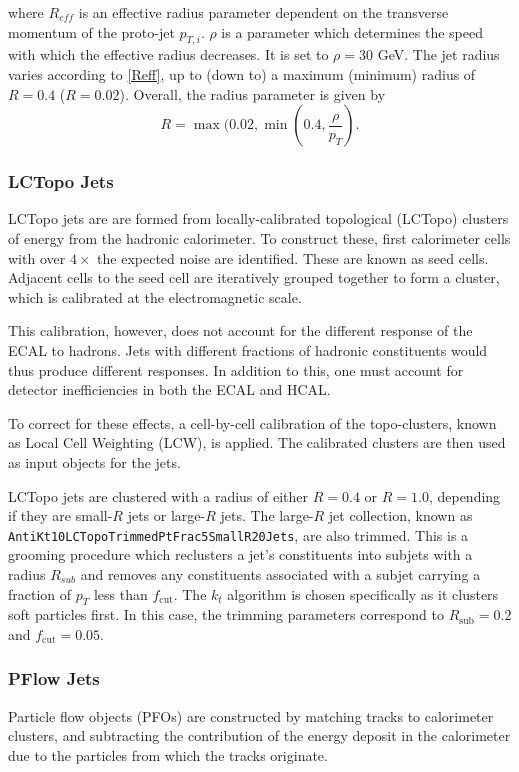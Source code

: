 \documentclass[10pt,a4paper]{book}
\newcommand{\code}[1]{\texttt{#1}}
\begin{document}
where $R_{eff}$ is an effective radius parameter dependent on the transverse momentum of the proto-jet $p_{T,i}$. $\rho$ is a parameter which determines the speed with which the effective radius decreases. It is set to $\rho = 30$ GeV. The jet radius varies according to \ref{Reff}, up to (down to) a maximum (minimum) radius of $R = 0.4$ ($R = 0.02$). Overall, the radius parameter is given by 
\begin{equation}
R = \max(0.02, \min(0.4, \frac{\rho}{p_T}).
\end{equation}

\subsubsection{LCTopo Jets}

LCTopo jets \cite{ATLAS:2016krp} are are formed from locally-calibrated topological (LCTopo) clusters of energy from the hadronic calorimeter. 
To construct these, first calorimeter cells with over $4\times$ the expected noise are identified. These are known as seed cells. Adjacent cells to the seed cell are iteratively grouped together to form a cluster, which is calibrated at the electromagnetic scale. 

This calibration, however, does not account for the different response of the ECAL to hadrons. Jets with different fractions of hadronic constituents would thus produce different responses. In addition to this, one must account for detector inefficiencies in both the ECAL and HCAL. 

To correct for these effects, a cell-by-cell calibration of the topo-clusters, known as Local Cell Weighting (LCW), is applied. The calibrated clusters are then used as input objects for the jets.

LCTopo jets are clustered with a radius of either $R = 0.4$ or $R = 1.0$, depending if they are small-$R$ jets or large-$R$ jets. The large-$R$ jet collection, known as \code{AntiKt10LCTopoTrimmedPtFrac5SmallR20Jets}, are also trimmed. This is a grooming procedure which reclusters a jet's constituents into subjets with a radius $R_{sub}$ and removes any constituents associated with a subjet carrying a fraction of $p_T$ less than $f_\mathrm{cut}$. The $k_t$ algorithm is chosen specifically as it clusters soft particles first. In this case, the trimming parameters correspond to $R_{\mathrm{sub}} = 0.2$ and $f_{\mathrm{cut}} = 0.05$.

\subsubsection{PFlow Jets}
Particle flow objects (PFOs) are constructed by matching tracks to calorimeter clusters, and subtracting the contribution of the energy deposit in the calorimeter due to the particles from which the tracks originate. 
\end{document}
